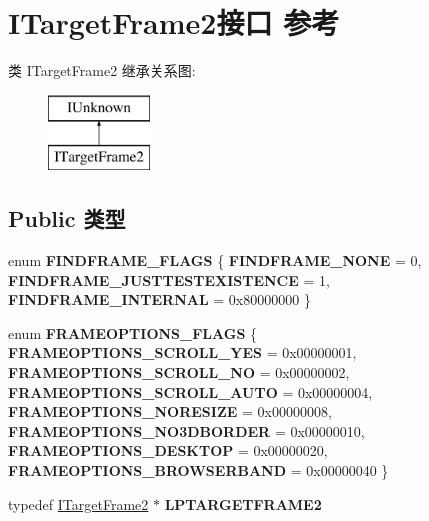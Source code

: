 \hypertarget{interface_i_target_frame2}{}\section{I\+Target\+Frame2接口 参考}
\label{interface_i_target_frame2}
类 I\+Target\+Frame2 继承关系图\+:\begin{figure}[H]
\begin{center}
\leavevmode
\includegraphics[height=2.000000cm]{interface_i_target_frame2}
\end{center}
\end{figure}
\subsection*{Public 类型}
\begin{DoxyCompactItemize}
\item 
\mbox{\label{interface_i_target_frame2_a03a2bcb10d559a4dec9f1d57fc69bb60}} 
enum {\bfseries F\+I\+N\+D\+F\+R\+A\+M\+E\+\_\+\+F\+L\+A\+GS} \{ {\bfseries F\+I\+N\+D\+F\+R\+A\+M\+E\+\_\+\+N\+O\+NE} = 0, 
{\bfseries F\+I\+N\+D\+F\+R\+A\+M\+E\+\_\+\+J\+U\+S\+T\+T\+E\+S\+T\+E\+X\+I\+S\+T\+E\+N\+CE} = 1, 
{\bfseries F\+I\+N\+D\+F\+R\+A\+M\+E\+\_\+\+I\+N\+T\+E\+R\+N\+AL} = 0x80000000
 \}
\item 
\mbox{\label{interface_i_target_frame2_aa8c82f7573ef24ac392025807ac51c03}} 
enum {\bfseries F\+R\+A\+M\+E\+O\+P\+T\+I\+O\+N\+S\+\_\+\+F\+L\+A\+GS} \{ \newline
{\bfseries F\+R\+A\+M\+E\+O\+P\+T\+I\+O\+N\+S\+\_\+\+S\+C\+R\+O\+L\+L\+\_\+\+Y\+ES} = 0x00000001, 
{\bfseries F\+R\+A\+M\+E\+O\+P\+T\+I\+O\+N\+S\+\_\+\+S\+C\+R\+O\+L\+L\+\_\+\+NO} = 0x00000002, 
{\bfseries F\+R\+A\+M\+E\+O\+P\+T\+I\+O\+N\+S\+\_\+\+S\+C\+R\+O\+L\+L\+\_\+\+A\+U\+TO} = 0x00000004, 
{\bfseries F\+R\+A\+M\+E\+O\+P\+T\+I\+O\+N\+S\+\_\+\+N\+O\+R\+E\+S\+I\+ZE} = 0x00000008, 
\newline
{\bfseries F\+R\+A\+M\+E\+O\+P\+T\+I\+O\+N\+S\+\_\+\+N\+O3\+D\+B\+O\+R\+D\+ER} = 0x00000010, 
{\bfseries F\+R\+A\+M\+E\+O\+P\+T\+I\+O\+N\+S\+\_\+\+D\+E\+S\+K\+T\+OP} = 0x00000020, 
{\bfseries F\+R\+A\+M\+E\+O\+P\+T\+I\+O\+N\+S\+\_\+\+B\+R\+O\+W\+S\+E\+R\+B\+A\+ND} = 0x00000040
 \}
\item 
\mbox{\label{interface_i_target_frame2_ae4f236db9af98a6b5fc232fe5d58e67d}} 
typedef \hyperlink{interface_i_target_frame2}{I\+Target\+Frame2} $\ast$ {\bfseries L\+P\+T\+A\+R\+G\+E\+T\+F\+R\+A\+M\+E2}
\end{DoxyCompactItemize}

